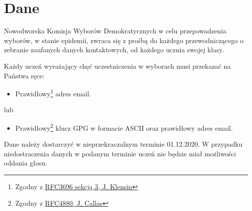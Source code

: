\section{Dane}


Nowodworska Komisja Wyborów Demokratycznych w celu przepowadzenia wyborów, w stanie epidemii, zwraca się z prośbą do każdego przewodniczącego o zebranie zaufanych danych kontaktowych, od każdego ucznia swojej klasy. \\

\par Każdy uczeń wyrażający chęć uczestniczenia w wyborach musi przekazać na Państwa ręce:

\begin{itemize}
  \item Prawidłowy\footnote{Zgodny z \href{https://tools.ietf.org/html/rfc3696}{RFC3696 sekcją 3, J. Klensin}} adres email.
\end{itemize}

\vspace{-0.3cm}
\hspace{1cm} lub
\vspace{-0.3cm}

\begin{itemize}
  \item Prawidłowy\footnote{Zgodny z \href{https://tools.ietf.org/html/rfc4880}{RFC4880, J. Callas}} klucz GPG w formacie ASCII oraz prawidłowy adres email.
\end{itemize}
\vspace{0.3cm} %
Dane należy dostarczyć w nieprzekraczalnym terminie 01.12.2020. W przypadku niedostraczenia danych w podanym terminie uczeń nie będzie miał możliwości oddania głosu.

